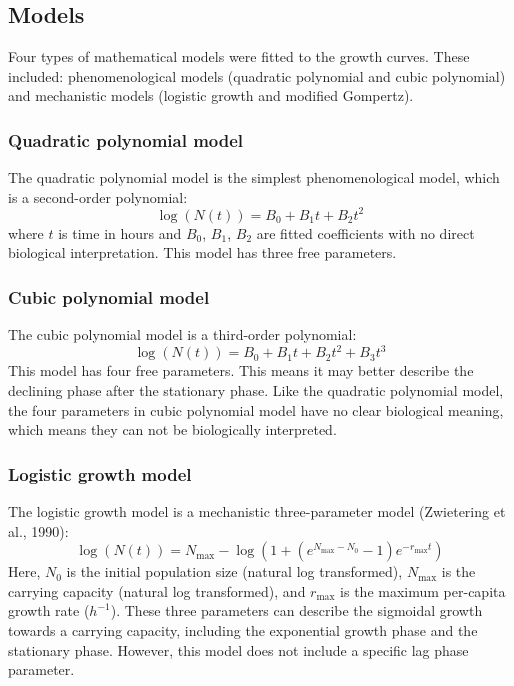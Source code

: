 \documentclass[11pt]{article}
\begin{document}
\subsection{Models}
Four types of mathematical models were fitted to the growth curves. These included: phenomenological models (quadratic polynomial and cubic polynomial) and mechanistic models (logistic growth and modified Gompertz).
\subsubsection{Quadratic polynomial model}
The quadratic polynomial model is the simplest phenomenological model, which is a second-order polynomial:
\begin{equation}
\log(N(t)) = B_0 + B_1 t + B_2 t^2
\end{equation}
where $t$ is time in hours and $B_0$, $B_1$, $B_2$ are fitted coefficients with no direct biological interpretation. This model has three free parameters.
\subsubsection{Cubic polynomial model}
The cubic polynomial model is a third-order polynomial:
\begin{equation}
\log(N(t)) = B_0 + B_1 t + B_2 t^2 + B_3 t^3
\end{equation}
This model has four free parameters. This means it may better describe the declining phase after the stationary phase. Like the quadratic polynomial model, the four parameters in cubic polynomial model have no clear biological meaning, which means they can not be biologically interpreted.
\subsubsection{Logistic growth model}
The logistic growth model is a mechanistic three-parameter model (Zwietering et al., 1990):
\begin{equation}
\log(N(t)) = N_{\max} - \log\left(1 + \left(e^{N_{\max}-N_0} - 1\right)e^{-r_{\max}t}\right)
\end{equation}
Here, \(N_0\) is the initial population size (natural log transformed), \(N_{\max}\) is the carrying capacity (natural log transformed), and \(r_{\max}\) is the maximum per-capita growth rate (\(h^{-1}\)). These three parameters can describe the sigmoidal growth towards a carrying capacity, including the exponential growth phase and the stationary phase. However, this model does not include a specific lag phase parameter.
\end{document}
